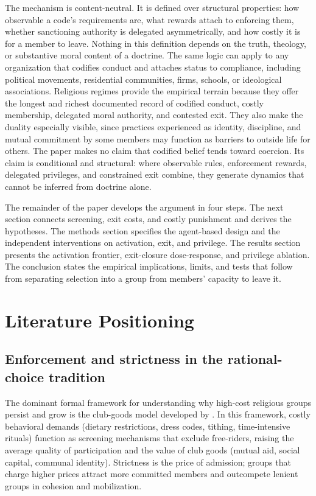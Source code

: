 \documentclass[12pt]{article}
\begin{document}
The mechanism is content-neutral. It is defined over structural properties: how observable a code's requirements are, what rewards attach to enforcing them, whether sanctioning authority is delegated asymmetrically, and how costly it is for a member to leave. Nothing in this definition depends on the truth, theology, or substantive moral content of a doctrine. The same logic can apply to any organization that codifies conduct and attaches status to compliance, including political movements, residential communities, firms, schools, or ideological associations. Religious regimes provide the empirical terrain because they offer the longest and richest documented record of codified conduct, costly membership, delegated moral authority, and contested exit. They also make the duality especially visible, since practices experienced as identity, discipline, and mutual commitment by some members may function as barriers to outside life for others. The paper makes no claim that codified belief tends toward coercion. Its claim is conditional and structural: where observable rules, enforcement rewards, delegated privileges, and constrained exit combine, they generate dynamics that cannot be inferred from doctrine alone.

The remainder of the paper develops the argument in four steps. The next section connects screening, exit costs, and costly punishment and derives the hypotheses. The methods section specifies the agent-based design and the independent interventions on activation, exit, and privilege. The results section presents the activation frontier, exit-closure dose-response, and privilege ablation. The conclusion states the empirical implications, limits, and tests that follow from separating selection into a group from members' capacity to leave it.

\section{Literature Positioning}

\subsection{Enforcement and strictness in the rational-choice tradition}

The dominant formal framework for understanding why high-cost religious groups persist and grow is the club-goods model developed by \citet{iannaccone1992,iannaccone1994}. In this framework, costly behavioral demands (dietary restrictions, dress codes, tithing, time-intensive rituals) function as screening mechanisms that exclude free-riders, raising the average quality of participation and the value of club goods (mutual aid, social capital, communal identity). Strictness is the price of admission; groups that charge higher prices attract more committed members and outcompete lenient groups in cohesion and mobilization.
\end{document}
